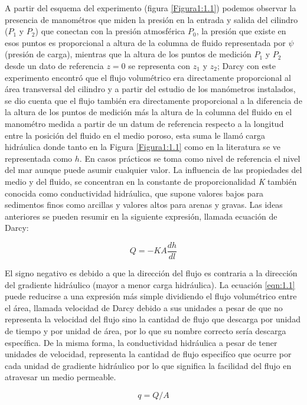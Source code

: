 A partir del esquema del experimento (figura \ref{Figura1:1.1}) podemos observar la presencia de manométros que miden la presión en la entrada y salida del cilindro ($P_{1}$ y $P_{2}$) que conectan con la presión atmosférica $P_{0}$, la presión que existe en esos puntos es proporcional a altura de la columna de fluido representada por $\psi$ (presión de carga), mientras que la altura de los puntos de medición $P_{1}$ y $P_{2}$ desde un dato de referencia $z=0$ se representa con $z_{1}$ y $z_{2}$; Darcy con este experimento encontró que el flujo volumétrico era directamente proporcional al área transversal del cilindro y a partir del estudio de los manómetros instalados, se dio cuenta que el flujo también era directamente proporcional a la diferencia de la altura de los puntos de medición más la altura de la columna del fluido en el manométro medida a partir de un datum de referencia respecto a la longitud entre la posición del fluido en el medio poroso, esta suma le llamó carga hidráulica donde tanto en la Figura \ref{Figura1:1.1} como en la literatura se ve representada como $h$. En casos prácticos se toma como nivel de referencia el nivel del mar aunque puede asumir cualquier valor. La influencia de las propiedades del medio y del fluido, se concentran en la constante de proporcionalidad \textit{K} también conocida como conductividad hidráulica, que supone valores bajos para sedimentos finos como arcillas y valores altos para arenas y gravas. Las ideas anteriores se pueden resumir en la siguiente expresión, llamada ecuación de Darcy:

\begin{equation}
\label{eqn:1.1}
 Q=-KA\dfrac{dh}{dl}
\end{equation}

El signo negativo es debido a que la dirección del flujo es contraria a la dirección del gradiente hidráulico (mayor a menor carga hidráulica). La ecuación \ref{eqn:1.1} puede reducirse a una expresión más simple dividiendo el flujo volumétrico entre el área, llamada velocidad de Darcy debido a sus unidades a pesar de que no representa la velocidad del flujo sino la cantidad de flujo que descarga por unidad de tiempo y por unidad de área, por lo que su nombre correcto sería descarga específica. De la misma forma, la conductividad hidráulica a pesar de tener unidades de velocidad, representa la cantidad de flujo especifíco que ocurre por cada unidad de gradiente hidráulico por lo que significa la facilidad del flujo en atravesar un medio permeable.  

\begin{equation}
 q=Q/A
\end{equation}


